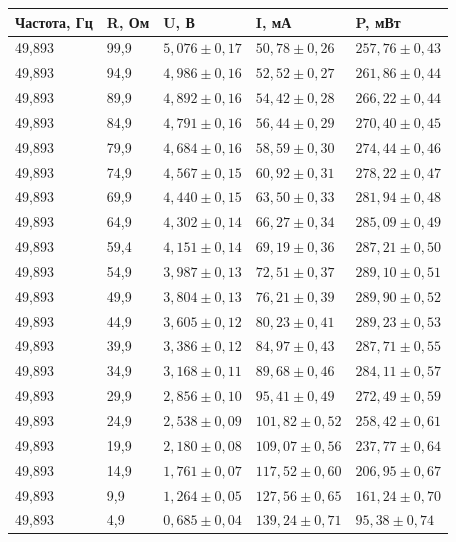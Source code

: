 \documentclass[a4paper,12pt]{article}
\begin{document}
\begin{table}[!ht]
    \centering
    \begin{tabular}{|l|l|l|l|l|}
    \hline
        Частота, Гц & R, Ом & U, В & I, мА & P, мВт \\ \hline
        49,893 & 99,9 & $5,076 \pm 0,17$& $50,78 \pm 0,26$& $257,76\pm0,43$ \\ \hline
        49,893 & 94,9 & $4,986 \pm 0,16$& $52,52 \pm 0,27$& $261,86\pm0,44$ \\ \hline
        49,893 & 89,9 &$ 4,892 \pm 0,16$& $54,42 \pm 0,28$& $266,22\pm0,44 $\\ \hline
        49,893 & 84,9 & $4,791 \pm 0,16$& $56,44 \pm 0,29$& $270,40\pm0,45 $\\ \hline
        49,893 & 79,9 & $4,684 \pm 0,16$& $58,59 \pm 0,30$& $274,44\pm0,46$ \\ \hline
        49,893 & 74,9 & $4,567 \pm 0,15$& $60,92 \pm 0,31$& $278,22\pm0,47$ \\ \hline
        49,893 & 69,9 & $4,440 \pm 0,15$& $63,50 \pm 0,33$& $281,94\pm0,48 $\\ \hline
        49,893 & 64,9 & $4,302 \pm 0,14$& $66,27 \pm 0,34$& $285,09\pm0,49 $\\ \hline
        49,893 & 59,4 &$ 4,151 \pm 0,14$& $69,19 \pm 0,36$& $287,21\pm0,50 $\\ \hline
        49,893 & 54,9 & $3,987 \pm 0,13$& $72,51 \pm 0,37$& $289,10\pm0,51 $\\ \hline
        49,893 & 49,9 & $3,804 \pm 0,13$& $76,21 \pm 0,39$& $289,90\pm0,52 $\\ \hline
        49,893 & 44,9 & $3,605 \pm 0,12$& $80,23 \pm 0,41$& $289,23\pm0,53 $\\ \hline
        49,893 & 39,9 & $3,386 \pm 0,12$& $84,97 \pm 0,43$& $287,71\pm0,55$ \\ \hline
        49,893 & 34,9 & $3,168 \pm 0,11$& $89,68 \pm 0,46$& $284,11\pm0,57 $\\ \hline
        49,893 & 29,9 & $2,856 \pm 0,10$& $95,41 \pm 0,49$& $272,49\pm0,59 $\\ \hline
        49,893 & 24,9 &$ 2,538 \pm 0,09$& $101,82 \pm 0,52$& $258,42\pm0,61 $\\ \hline
        49,893 & 19,9 & $2,180 \pm 0,08$& $109,07 \pm 0,56$& $237,77\pm0,64 $\\ \hline
        49,893 & 14,9 & $1,761 \pm 0,07$& $117,52 \pm 0,60$& $206,95\pm0,67 $\\ \hline
        49,893 & 9,9 &$1,264 \pm 0,05$& $127,56 \pm 0,65$& $161,24\pm0,70 $\\ \hline
        49,893 & 4,9 &$ 0,685 \pm 0,04$& $139,24 \pm 0,71$& $95,38\pm0,74 $\\ \hline
    \end{tabular}
\end{table}
\end{document}
